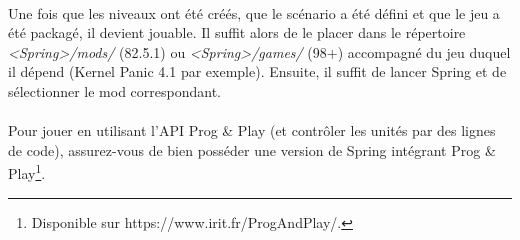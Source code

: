 \documentclass[a4paper]{article}
\begin{document}
\paragraph{ }
Une fois que les niveaux ont été créés, que le scénario a été défini et que le jeu a été packagé, il devient jouable. Il suffit alors de le placer dans le répertoire \textit{<Spring>/mods/} (82.5.1) ou \textit{<Spring>/games/} (98+) accompagné du jeu duquel il dépend (Kernel Panic 4.1 par exemple). Ensuite, il suffit de lancer Spring et de sélectionner le mod correspondant.
\paragraph{ }
Pour jouer en utilisant l'API Prog \& Play (et contrôler les unités par des lignes de code), assurez-vous de bien posséder une version de Spring intégrant Prog \& Play\footnote{Disponible sur https://www.irit.fr/ProgAndPlay/.}.
\end{document}
